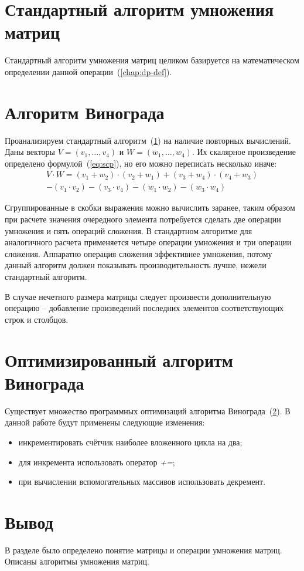 \section{Стандартный алгоритм умножения матриц}
\label{chap:std-alg}

Стандартный алгоритм умножения матриц целиком базируется на математическом определении данной операции~(\ref{chap:dp-def}).

\section{Алгоритм Винограда}
\label{chap:vin}
Проанализируем стандартный алгоритм~(\ref{chap:std-alg}) на наличие повторных вычислений. Даны векторы $V = (v_1, \ldots, v_4)$ и $W = (w_1, \ldots, w_4)$. Их скалярное произведение определено формулой~(\ref{eq:scp}), но его можно переписать несколько иначе:
\begin{equation}
	\label{eq:vinscal}
	\begin{gathered} 
		V \cdot W = (v_1 + w_2) \cdot (v_2 + w_1) + (v_3 + w_4) \cdot (v_4 + w_3) \\
		- (v_1 \cdot v_2) - (v_3 \cdot v_4) - (w_1 \cdot w_2) - (w_3 \cdot w_4)
	\end{gathered}
\end{equation}

Сгруппированные в скобки выражения можно вычислить заранее, таким образом при расчете значения очередного элемента потребуется сделать две операции умножения и пять операций сложения. В стандартном алгоритме для аналогичного расчета применяется четыре операции умножения и три операции сложения. Аппаратно операция сложения эффективнее умножения, потому данный алгоритм должен показывать производительность лучше, нежели стандартный алгоритм.

В случае нечетного размера матрицы следует произвести дополнительную операцию -- добавление произведений последних элементов соответствующих строк и столбцов.

\section{Оптимизированный алгоритм Винограда}

Существует множество программных оптимизаций алгоритма Винограда~(\ref{chap:vin}). В данной работе будут применены следующие изменения:
\begin{itemize}[label=--]
    \item инкрементировать счётчик наиболее вложенного цикла на два;
    \item для инкремента использовать оператор \textit{+=};
    \item при вычислении вспомогательных массивов использовать декремент.
\end{itemize}

\section*{Вывод}    

В разделе было определено понятие матрицы и операции умножения матриц. Описаны алгоритмы умножения матриц.
